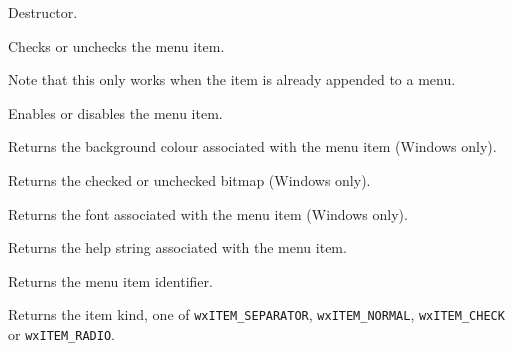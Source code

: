 \label{wxmenuitemdtor}


Destructor.


\label{wxmenuitemcheck}


Checks or unchecks the menu item.

Note that this only works when the item is already appended to a menu.


\label{wxmenuitemenable}


Enables or disables the menu item.


\label{wxmenuitemgetbackgroundcolour}


Returns the background colour associated with the menu item (Windows only).


\label{wxmenuitemgetbitmap}


Returns the checked or unchecked bitmap (Windows only).


\label{wxmenuitemgetfont}


Returns the font associated with the menu item (Windows only).


\label{wxmenuitemgethelp}


Returns the help string associated with the menu item.


\label{wxmenuitemgetid}


Returns the menu item identifier.


\label{wxmenuitemgetkind}


Returns the item kind, one of {\tt wxITEM\_SEPARATOR}, {\tt wxITEM\_NORMAL}, 
{\tt wxITEM\_CHECK} or {\tt wxITEM\_RADIO}.


